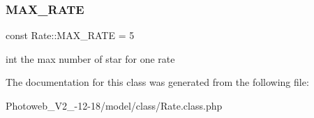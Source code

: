 \subsubsection{\texorpdfstring{M\+A\+X\+\_\+\+R\+A\+TE}{MAX\_RATE}}
{\footnotesize\ttfamily const Rate\+::\+M\+A\+X\+\_\+\+R\+A\+TE = 5}

int the max number of star for one rate 

The documentation for this class was generated from the following file\+:\begin{DoxyCompactItemize}
\item 
Photoweb\+\_\+\+V2\+\_-\/12-\/18/model/class/Rate.\+class.\+php\end{DoxyCompactItemize}
